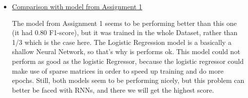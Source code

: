 \documentclass[12pt]{report}
\begin{document}
\begin{itemize}
    \item \underline{Comparison with model from Assignment 1}
        \smallskip

        The model from Assignment 1 seems to be performing better than this one (it had
        0.80 F1-score), but it was trained in the whole Dataset, rather than 1/3 which
        is the case here. The Logistic Regression model is a basically a shallow Neural
        Network, so that's why is performs ok. This model could not perform as good as the
        logistic Regressor, because the logistic regressor could make use of sparse
        matrices in order to speed up training and do more epochs. Still, both models
        seem to be performing nicely, but this problem can better be faced with RNNs,
        and there we will get the highest score.

\end{itemize}



\end{document}
